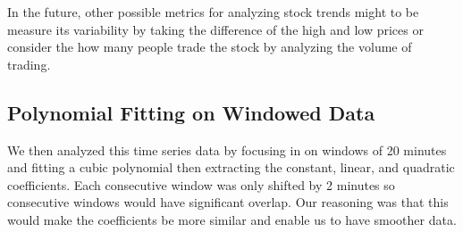 \documentclass[final]{article}
\begin{document}
In the future, other possible metrics for analyzing stock trends might to be
measure its variability by taking the difference of the high and low prices or
consider the how many people trade the stock by analyzing the volume of
trading.

\subsection{Polynomial Fitting on Windowed Data}

We then analyzed this time series data by focusing in on windows of 20 minutes
and fitting a cubic polynomial then extracting the constant, linear, and
quadratic coefficients. Each consecutive window was only shifted by 2 minutes
so consecutive windows would have significant overlap. Our reasoning was that
this would make the coefficients be more similar and enable us to have smoother
data.
\end{document}
